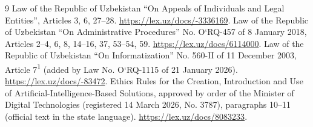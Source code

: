 \documentclass[14pt,a4paper]{extarticle}
\begin{document}
\begin{thebibliography}{9}
 Law of the Republic of Uzbekistan “On Appeals of Individuals and Legal Entities”, Articles 3, 6, 27–28. \url{https://lex.uz/docs/-3336169}.
 Law of the Republic of Uzbekistan “On Administrative Procedures” No. O‘RQ-457 of 8 January 2018, Articles 2–4, 6, 8, 14–16, 37, 53–54, 59. \url{https://lex.uz/docs/6114000}.
 Law of the Republic of Uzbekistan “On Informatization” No. 560-II of 11 December 2003, Article 7\textsuperscript{1} (added by Law No. O‘RQ-1115 of 21 January 2026). \url{https://lex.uz/docs/-83472}.
 Ethics Rules for the Creation, Introduction and Use of Artificial-Intelligence-Based Solutions, approved by order of the Minister of Digital Technologies (registered 14 March 2026, No. 3787), paragraphs 10–11 (official text in the state language). \url{https://lex.uz/docs/8083233}.
\end{thebibliography}\endgroup
\end{document}
